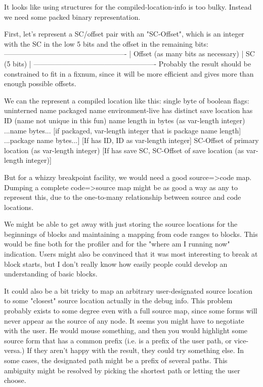 It looks like using structures for the compiled-location-info is too bulky.
Instead we need some packed binary representation.

First, let's represent a SC/offset pair with an "SC-Offset", which is an
integer with the SC in the low 5 bits and the offset in the remaining bits:
    ----------------------------------------------------
    | Offset (as many bits as necessary) | SC (5 bits) |
    ----------------------------------------------------
Probably the result should be constrained to fit in a fixnum, since it will be
more efficient and gives more than enough possible offsets.

We can the represent a compiled location like this:
    single byte of boolean flags:
	uninterned name
	packaged name
	environment-live
	has distinct save location
        has ID (name not unique in this fun)
    name length in bytes (as var-length integer)
    ...name bytes...
    [if packaged, var-length integer that is package name length]
     ...package name bytes...]
    [If has ID, ID as var-length integer]
    SC-Offset of primary location (as var-length integer)
    [If has save SC, SC-Offset of save location (as var-length integer)]




But for a whizzy breakpoint facility, we would need a good source=>code map.
Dumping a complete code=>source map might be as good a way as any to represent
this, due to the one-to-many relationship between source and code locations.

We might be able to get away with just storing the source locations for the
beginnings of blocks and maintaining a mapping from code ranges to blocks.
This would be fine both for the profiler and for the "where am I running now"
indication.  Users might also be convinced that it was most interesting to
break at block starts, but I don't really know how easily people could develop
an understanding of basic blocks.

It could also be a bit tricky to map an arbitrary user-designated source
location to some "closest" source location actually in the debug info.
This problem probably exists to some degree even with a full source map, since
some forms will never appear as the source of any node.  It seems you might
have to negotiate with the user.  He would mouse something, and then you would
highlight some source form that has a common prefix (i.e. is a prefix of the
user path, or vice-versa.)  If they aren't happy with the result, they could
try something else.  In some cases, the designated path might be a prefix of
several paths.  This ambiguity might be resolved by picking the shortest path
or letting the user choose.

